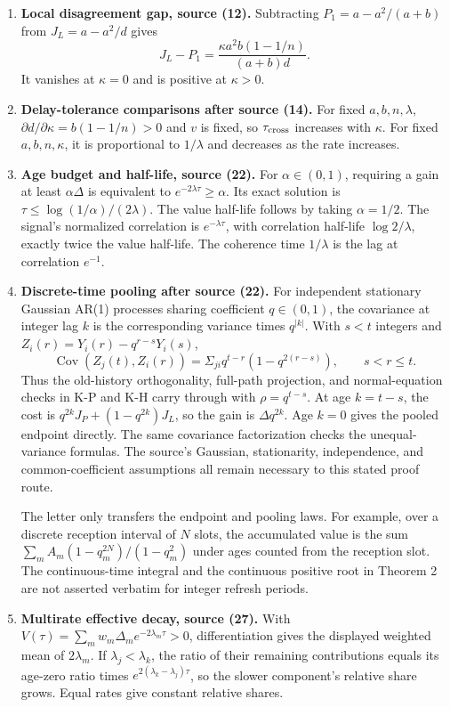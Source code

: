 \documentclass[11pt,letterpaper]{article}
\newcommand{\Cov}{\operatorname{Cov}}
\begin{document}
\begin{enumerate}
\item \textbf{Local disagreement gap, source (12).}
Subtracting $P_1=a-a^2/(a+b)$ from $J_L=a-a^2/d$ gives
\[
J_L-P_1=\frac{\kappa a^2b(1-1/n)}{(a+b)d}.
\]
It vanishes at $\kappa=0$ and is positive at $\kappa>0$.

\item \textbf{Delay-tolerance comparisons after source (14).}
For fixed $a,b,n,\lambda$, $\partial d/\partial\kappa=b(1-1/n)>0$ and $v$ is fixed, so $\tau_{\rm cross}$ increases with $\kappa$. For fixed $a,b,n,\kappa$, it is proportional to $1/\lambda$ and decreases as the rate increases.

\item \textbf{Age budget and half-life, source (22).}
For $\alpha\in(0,1)$, requiring a gain at least $\alpha\Delta$ is equivalent to $e^{-2\lambda\tau}\ge\alpha$. Its exact solution is $\tau\le\log(1/\alpha)/(2\lambda)$. The value half-life follows by taking $\alpha=1/2$. The signal's normalized correlation is $e^{-\lambda\tau}$, with correlation half-life $\log 2/\lambda$, exactly twice the value half-life. The coherence time $1/\lambda$ is the lag at correlation $e^{-1}$.

\item \textbf{Discrete-time pooling after source (22).}
For independent stationary Gaussian AR(1) processes sharing coefficient $q\in(0,1)$, the covariance at integer lag $k$ is the corresponding variance times $q^{|k|}$. With $s<t$ integers and $Z_i(r)=Y_i(r)-q^{r-s}Y_i(s)$,
\[
\Cov(Z_j(t),Z_i(r))=\Sigma_{ji}q^{t-r}(1-q^{2(r-s)}),\qquad s<r\le t.
\]
Thus the old-history orthogonality, full-path projection, and normal-equation checks in K-P and K-H carry through with $\rho=q^{t-s}$. At age $k=t-s$, the cost is $q^{2k}J_P+(1-q^{2k})J_L$, so the gain is $\Delta q^{2k}$. Age $k=0$ gives the pooled endpoint directly. The same covariance factorization checks the unequal-variance formulas. The source's Gaussian, stationarity, independence, and common-coefficient assumptions all remain necessary to this stated proof route.

The letter only transfers the endpoint and pooling laws. For example, over a discrete reception interval of $N$ slots, the accumulated value is the sum $\sum_m A_m(1-q_m^{2N})/(1-q_m^2)$ under ages counted from the reception slot. The continuous-time integral and the continuous positive root in Theorem 2 are not asserted verbatim for integer refresh periods.

\item \textbf{Multirate effective decay, source (27).}
With $V(\tau)=\sum_mw_m\Delta_m e^{-2\lambda_m\tau}>0$, differentiation gives the displayed weighted mean of $2\lambda_m$. If $\lambda_j<\lambda_k$, the ratio of their remaining contributions equals its age-zero ratio times $e^{2(\lambda_k-\lambda_j)\tau}$, so the slower component's relative share grows. Equal rates give constant relative shares.


\end{enumerate}
\end{document}
